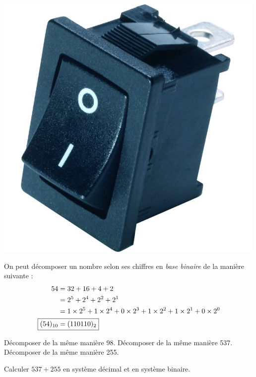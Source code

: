 \documentclass["../Cours.tex"]{subfiles}
\begin{document}
{\begin{questions}
    \begin{center}
        \includegraphics[scale=0.2]{4 - Quatrieme/problemes/72374-9540269.jpg}
    \end{center}

    \question On peut décomposer un nombre selon ses chiffres en \emph{base binaire} de la manière suivante : 
    \begin{align*}
        54 &= 32 + 16 + 4 + 2 \\
        &= 2^5 + 2^4 + 2^2 + 2^1 \\
        &= 1 \times 2^5 + 1 \times 2^4 + 0 \times 2^3 + 1 \times 2^2 + 1 \times 2^1 + 0 \times 2^0 \\
        \Aboxed{(54)_{10} &= (110110)_{2}}
    \end{align*}

    \subquestion Décomposer de la même manière 98.
    \subquestion Décomposer de la même manière 537.
    \subquestion Décomposer de la même manière 255.

    \question Calculer $537+255$ en système décimal et en système binaire.


\end{questions}}
\end{document}

